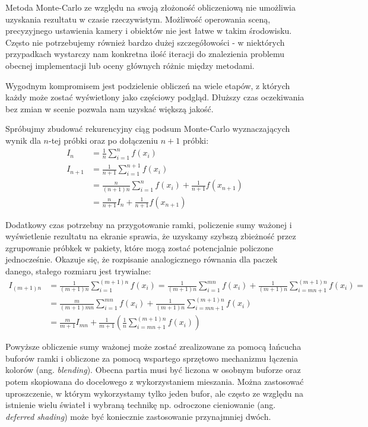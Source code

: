 \documentclass[../main.tex]{subfiles}
\begin{document}
Metoda Monte-Carlo ze względu na swoją złożoność obliczeniową nie umożliwia uzyskania rezultatu w czasie rzeczywistym. Możliwość operowania sceną, precyzyjnego ustawienia kamery i obiektów nie jest łatwe w takim środowisku. Często nie potrzebujemy również bardzo dużej szczegółowości - w niektórych przypadkach wystarczy nam konkretna ilość iteracji do znalezienia problemu obecnej implementacji lub oceny głównych różnic między metodami.

Wygodnym kompromisem jest podzielenie obliczeń na wiele etapów, z których każdy
może zostać wyświetlony jako częściowy podgląd. Dłuższy czas oczekiwania bez
zmian w scenie pozwala nam uzyskać większą jakość.

Spróbujmy zbudować rekurencyjny ciąg podsum Monte-Carlo wyznaczających wynik dla $n$-tej próbki oraz po dołączeniu $n+1$ próbki:
\begin{align*}
I_n &= \frac{1}{n} \sum_{i=1}^{n} f(x_i) \\
I_{n+1} &= \frac{1}{n+1} \sum_{i=1}^{n+1}f(x_i) \\
	&= \frac{n}{(n+1)n} \sum_{i=1}^{n}f(x_i) + \frac{1}{n+1}f(x_{n+1}) \\
	&= \frac{n}{n+1} I_{n} + \frac{1}{n+1}f(x_{n+1})
\end{align*}

Dodatkowy czas potrzebny na przygotowanie ramki, policzenie sumy ważonej i
wyświetlenie rezultatu na ekranie sprawia, że uzyskamy szybszą zbieżność przez
zgrupowanie próbkek w pakiety, które mogą zostać potencjalnie policzone
jednocześnie. Okazuje się, że rozpisanie analogicznego równania dla paczek
danego, stałego rozmiaru jest trywialne:
\begin{align*}
  I_{(m+1)n} &= \frac{1}{(m+1)n} \sum_{i=1}^{(m+1)n} f(x_i)
  = \frac{1}{(m+1)n} \sum_{i=1}^{mn} f(x_i)
    + \frac{1}{(m+1)n} \sum_{i=mn+1}^{(m+1)n} f(x_i) = \\
  &= \frac{m}{(m+1)mn} \sum_{i=1}^{mn} f(x_i)
    + \frac{1}{(m+1)n} \sum_{i=mn+1}^{(m+1)n} f(x_i) \\
  &= \frac{m}{m+1}I_{mn}
    + \frac{1}{m+1} \left(
        \frac{1}{n} \sum_{i=mn+1}^{(m+1)n} f(x_i)
    \right)
\end{align*}

Powyższe obliczenie sumy ważonej może zostać zrealizowane za pomocą łańcucha buforów ramki i obliczone za pomocą wspartego sprzętowo mechanizmu łączenia kolorów (ang. \textit{blending}). Obecna partia musi być liczona w osobnym buforze oraz potem skopiowana do docelowego z wykorzystaniem mieszania. Można zastosować uproszczenie, w którym wykorzystamy tylko jeden bufor, ale często ze względu na istnienie wielu świateł i wybraną technikę np. odroczone cieniowanie (ang. \textit{deferred shading}) może być koniecznie zastosowanie przynajmniej dwóch.
\end{document}
